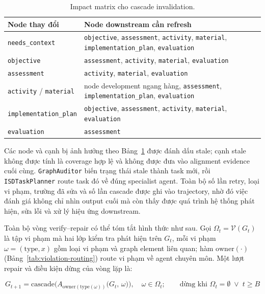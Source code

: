 \documentclass[../main.tex]{subfiles}
\begin{document}
\begin{table}[H]
\centering
\footnotesize
\caption{Impact matrix cho cascade invalidation.}
\label{tab:impact-matrix}
\begin{tabular}{p{4.0cm}p{9.0cm}}
\hline
\textbf{Node thay đổi} & \textbf{Node downstream cần refresh} \\
\hline
\texttt{needs\_context} & \texttt{objective}, \texttt{assessment}, \texttt{activity}, \texttt{material}, \texttt{implementation\_plan}, \texttt{evaluation} \\
\texttt{objective} & \texttt{assessment}, \texttt{activity}, \texttt{material}, \texttt{evaluation} \\
\texttt{assessment} & \texttt{activity}, \texttt{material}, \texttt{evaluation} \\
\texttt{activity} / \texttt{material} & node development ngang hàng, \texttt{assessment}, \texttt{implementation\_plan}, \texttt{evaluation} \\
\texttt{implementation\_plan} & \texttt{objective}, \texttt{assessment}, \texttt{activity}, \texttt{material}, \texttt{evaluation} \\
\texttt{evaluation} & \texttt{assessment} \\
\hline
\end{tabular}
\end{table}

Các node và cạnh bị ảnh hưởng theo Bảng~\ref{tab:impact-matrix} được đánh dấu stale; cạnh stale không được tính là coverage hợp lệ và không được đưa vào alignment evidence cuối cùng. \texttt{GraphAuditor} biến trạng thái stale thành task mới, rồi \texttt{ISDTaskPlanner} route task đó về đúng specialist agent. Toàn bộ số lần retry, loại vi phạm, trường đã sửa và số lần cascade được ghi vào trajectory, nhờ đó việc đánh giá không chỉ nhìn output cuối mà còn thấy được quá trình hệ thống phát hiện, sửa lỗi và xử lý hiệu ứng downstream.

Toàn bộ vòng verify--repair có thể tóm tắt hình thức như sau. Gọi $\Omega_t = \mathcal{V}(G_t)$ là tập vi phạm mà hai lớp kiểm tra phát hiện trên $G_t$, mỗi vi phạm $\omega = (\mathrm{type}, x)$ gồm loại vi phạm và graph element liên quan; hàm $\mathrm{owner}(\cdot)$ (Bảng~\ref{tab:violation-routing}) route vi phạm về agent chuyên môn. Một lượt repair và điều kiện dừng của vòng lặp là:

\begin{equation}\label{eq:verify-repair}
G_{t+1} = \mathrm{cascade}\Big(A_{\mathrm{owner}(\mathrm{type}(\omega))}\big(G_t,\, \omega\big)\Big), \quad \omega \in \Omega_t;
\qquad \text{dừng khi } \Omega_t = \emptyset \;\lor\; t \geq B
\end{equation}
\end{document}
